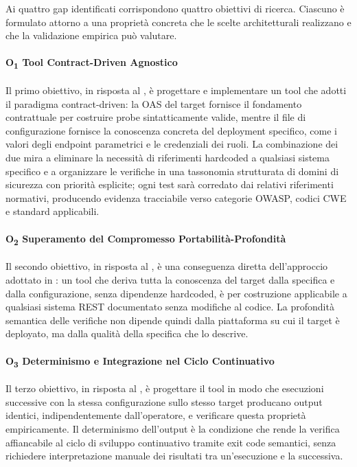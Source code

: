 Ai quattro gap identificati corrispondono quattro obiettivi di ricerca. Ciascuno è formulato attorno a una proprietà concreta che le scelte architetturali realizzano e che la validazione empirica può valutare.

\paragraph{O\textsubscript{1} Tool Contract-Driven Agnostico}\label{o1:tool-agnostico}
Il primo obiettivo, in risposta al , è progettare e implementare un tool che adotti il paradigma contract-driven: la \gls{OAS} del target fornisce il fondamento contrattuale per costruire probe sintatticamente valide, mentre il file di configurazione fornisce la conoscenza concreta del deployment specifico, come i valori degli endpoint parametrici e le credenziali dei ruoli. La combinazione dei due mira a eliminare la necessità di riferimenti hardcoded a qualsiasi sistema specifico e a organizzare le verifiche in una tassonomia strutturata di domini di sicurezza con priorità esplicite; ogni test sarà corredato dai relativi riferimenti normativi, producendo evidenza tracciabile verso categorie \gls{OWASP}, codici \gls{CWE} e standard applicabili.

\paragraph{O\textsubscript{2} Superamento del Compromesso Portabilità-Profondità}\label{o2:profondita-portabilita}
Il secondo obiettivo, in risposta al , è una conseguenza diretta dell'approccio adottato in : un tool che deriva tutta la conoscenza del target dalla specifica e dalla configurazione, senza dipendenze hardcoded, è per costruzione applicabile a qualsiasi sistema REST documentato senza modifiche al codice. La profondità semantica delle verifiche non dipende quindi dalla piattaforma su cui il target è deployato, ma dalla qualità della specifica che lo descrive.

\paragraph{O\textsubscript{3} Determinismo e Integrazione nel Ciclo Continuativo}\label{o3:riproducibilita-cicd}
Il terzo obiettivo, in risposta al , è progettare il tool in modo che esecuzioni successive con la stessa configurazione sullo stesso target producano output identici, indipendentemente dall'operatore, e verificare questa proprietà empiricamente. Il determinismo dell'output è la condizione che rende la verifica affiancabile al ciclo di sviluppo continuativo tramite exit code semantici, senza richiedere interpretazione manuale dei risultati tra un'esecuzione e la successiva.


